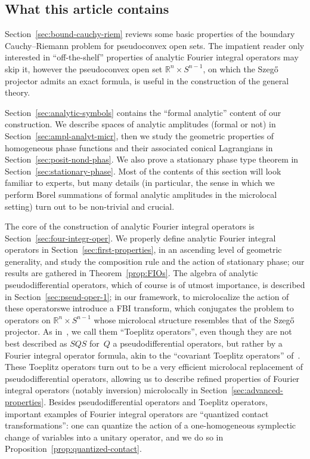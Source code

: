 \documentclass[AHL,Unicode,longabstracts,published]{cedram}
\newcommand\1{\mathds{1}}
\newcommand{\R}{\mathbb{R}}
\begin{document}
\subsection{What this article contains}\label{sec:what-this-article}

Section~\ref{sec:bound-cauchy-riem} reviews some basic properties of the boundary Cauchy--Riemann problem for pseudoconvex open sets. The impatient reader only interested in ``off-the-shelf'' properties of analytic Fourier integral operators may skip it, however the pseudoconvex open set $\R^n\times S^{n-1}$, on which the Szeg\H{o} projector admits an exact formula, is useful in the construction of the general theory.

Section~\ref{sec:analytic-symbols} contains the ``formal analytic'' content of our construction. We describe spaces of analytic amplitudes (formal or not) in Section~\ref{sec:ampl-analyt-micr}, then we study the geometric properties of homogeneous phase functions and their associated conical Lagrangians in Section~\ref{sec:posit-nond-phas}. We also prove a stationary phase type theorem in Section~\ref{sec:stationary-phase}. Most of the contents of this section will look familiar to experts, but many details (in particular, the sense in which we perform Borel summations of formal analytic amplitudes in the microlocal setting) turn out to be non-trivial and crucial.

The core of the construction of analytic Fourier integral operators is Section~\ref{sec:four-integr-oper}. We properly define analytic {Fourier integral operators} in Section~\ref{sec:first-properties}, in an ascending level of geometric generality, and study the composition rule and the action of stationary phase; our results are gathered in Theorem~\ref{prop:FIOs}. The algebra of analytic pseudodifferential operators, which of course is of utmost importance, is described in Section~\ref{sec:pseud-oper-1}; in our framework, to microlocalize the action of these operators\linebreak we introduce a FBI transform, which conjugates the problem to operators on $\R^n\times S^{n-1}$ whose microlocal structure resembles that of the Szeg\H{o} projector. As in~\cite{boutet_de_monvel_spectral_1981}, we call them ``Toeplitz operators'', even though they are not best described as $SQS$ for~$Q$ a pseudodifferential operators, but rather by a {Fourier integral operator} formula, akin to the ``covariant Toeplitz operators'' of~\cite{charles_berezin-toeplitz_2003}. These Toeplitz operators turn out to be a very efficient microlocal replacement of pseudodifferential operators, allowing us to describe refined properties of Fourier integral operators (notably inversion) microlocally in Section~\ref{sec:advanced-properties}. Besides pseudodifferential operators and Toeplitz operators, important examples of {Fourier integral operators} are ``quantized contact transformations'': one can quantize the action of a one-homogeneous symplectic change of variables into a unitary operator, and we do so in Proposition~\ref{prop:quantized-contact}.
\end{document}
